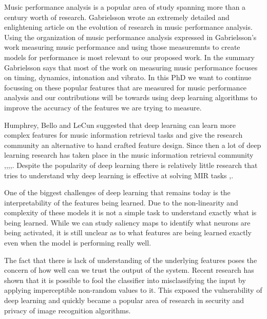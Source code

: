 \documentclass[journal,onecolumn]{IEEEtran}
\begin{document}
Music performance analysis is a popular area of study spanning more than a century worth of research. Gabrielsson \cite{gabrielsson_music_2003} wrote an extremely detailed and enlightening article on the evolution of research in music performance analysis. Using the organization of music performance analysis expressed in Gabrielsson's work \cite{gabrielsson_music_2003} measuring music performance and using those measuremnts to create models for performance is most relevant to our proposed work. In the summary Gabrielsson says that most of the work on measuring music performance focuses on timing, dynamics, intonation and vibrato. In this PhD we want to continue focussing on these popular features that are measured for music performance analysis and our contributions will be towards using deep learning algorithms to improve the accuracy of the features we are trying to measure. 

Humphrey, Bello and LeCun \cite{humphrey_moving_nodate} suggested that deep learning can learn more complex features for music information retrieval tasks and give the research community an alternative to hand crafted feature design. Since then a lot of deep learning research has taken place in the music information retrieval community \cite{wang_improving_2014},\cite{zhou_chord_2015},\cite{dieleman_end--end_2014},\cite{dieleman_multiscale_nodate},\cite{costa_evaluation_2017}. 
Despite the popularity of deep learning there is relatively little research that tries to understand why deep learning is effective at solving MIR tasks \cite{mishra_understanding_2018},\cite{choi_explaining_2016}.

One of the biggest challenges of deep learning that remains today is the interpretability of the features being learned. Due to the non-linearity and complexity of these models it is not a simple task to understand exactly what is being learned. While we can study saliency maps to identify what neurons are being activated, it is still unclear as to what features are being learned exactly even when the model is performing really well.

The fact that there is lack of understanding of the underlying features poses the concern of how well can we trust the output of the system. Recent research \cite{szegedy_intriguing_2013} \cite{goodfellow_explaining_2014} has shown that it is possible to fool the classifier into misclassifying the input by applying imperceptible non-random values to it. This exposed the vulnerability of deep learning and quickly became a popular area of research in security and privacy of image recognition algorithms. 
\end{document}
